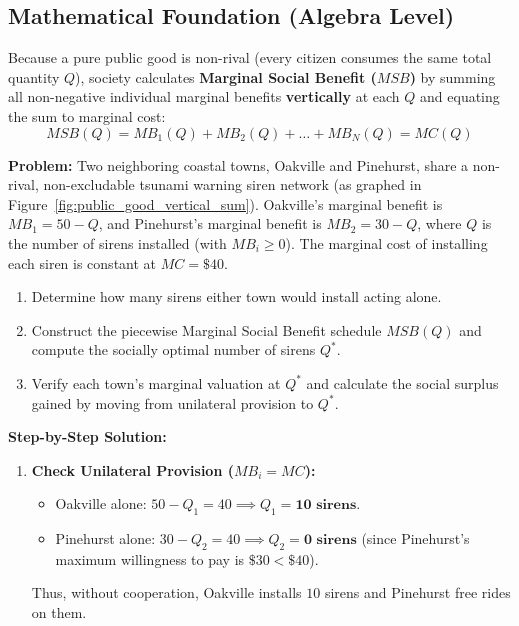 \documentclass[11pt,letterpaper]{article}
\begin{document}
\subsection*{Mathematical Foundation (Algebra Level)}
Because a pure public good is non-rival (every citizen consumes the same total quantity $Q$), society calculates \textbf{Marginal Social Benefit ($MSB$)} by summing all non-negative individual marginal benefits \textbf{vertically} at each $Q$ and equating the sum to marginal cost:
\begin{equation}
MSB(Q) = MB_1(Q) + MB_2(Q) + \dots + MB_N(Q) = MC(Q)
\end{equation}

\begin{tcolorbox}[colback=CourseBlue!5!white,colframe=CourseBlue!80!black,title=\textbf{Work It Out: Vertical Summation for a Local Public Good}]
\textbf{Problem:} Two neighboring coastal towns, Oakville and Pinehurst, share a non-rival, non-excludable tsunami warning siren network (as graphed in Figure~\ref{fig:public_good_vertical_sum}). Oakville's marginal benefit is $MB_1 = 50 - Q$, and Pinehurst's marginal benefit is $MB_2 = 30 - Q$, where $Q$ is the number of sirens installed (with $MB_i \ge 0$). The marginal cost of installing each siren is constant at $MC = \$40$.
\begin{enumerate}
    \item Determine how many sirens either town would install acting alone.
    \item Construct the piecewise Marginal Social Benefit schedule $MSB(Q)$ and compute the socially optimal number of sirens $Q^*$.
    \item Verify each town's marginal valuation at $Q^*$ and calculate the social surplus gained by moving from unilateral provision to $Q^*$.
\end{enumerate}

\medskip
\noindent\textbf{Step-by-Step Solution:}
\begin{enumerate}
    \item \textbf{Check Unilateral Provision ($MB_i = MC$):}
    \begin{itemize}
        \item Oakville alone: $50 - Q_1 = 40 \implies Q_1 = \mathbf{10\text{ sirens}}$.
        \item Pinehurst alone: $30 - Q_2 = 40 \implies Q_2 = \mathbf{0\text{ sirens}}$ (since Pinehurst's maximum willingness to pay is $\$30 < \$40$).
    \end{itemize}
    Thus, without cooperation, Oakville installs $10$ sirens and Pinehurst free rides on them.


\end{enumerate}
\end{tcolorbox}
\end{document}
